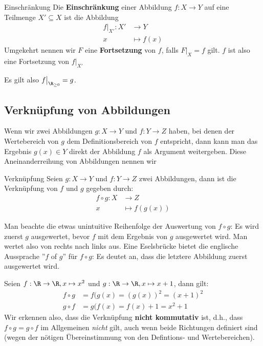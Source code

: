 \begin{definition}{Einschränkung}{}
Die \textbf{Einschränkung} einer Abbildung $f: X \to Y$ auf eine Teilmenge $X' \subseteq X$ ist die Abbildung
\begin{align*}
    f\big|_{X'}: X' &\to Y \\
    x & \mapsto f(x)
\end{align*}
Umgekehrt nennen wir $F$ eine \textbf{Fortsetzung} von $f$, falls $F\big|_X = f$ gilt. $f$ ist also eine Fortsetzung von $f\big|_{X'}$
\end{definition}
\begin{example} Es gilt also $f\big|_{\R_{\geq 0}} = g$.
\end{example}

\subsection{Verknüpfung von Abbildungen}
Wenn wir zwei Abbildungen $g: X \to Y$ und $f: Y \to Z$ haben, bei denen der Wertebereich von $g$ dem Definitionsbereich von $f$ entspricht, dann kann man das Ergebnis $g(x) \in Y$ direkt der Abbildung $f$ als Argument weitergeben. Diese Aneinanderreihung von Abbildungen nennen wir 

\begin{definition}{Verknüpfung}{}
Seien  $g: X \to Y$ und $f: Y \to Z$ zwei Abbildungen, dann ist die Verknüpfung von $f$ und $g$ gegeben durch:
\begin{align*}
    f \circ g: X &\to Z\\ x &\mapsto f(g(x))
\end{align*}
\end{definition}
\begin{remark}
Man beachte die etwas unintuitive Reihenfolge der Auswertung von $f \circ g$: Es wird zuerst $g$ ausgewertet, bevor $f$ mit dem Ergebnis von $g$ ausgewertet wird. Man wertet also von rechts nach links aus. Eine Eselsbrücke bietet die englische Aussprache ''$f$ of $g$'' für $f\circ g$: Es deutet an, dass die letztere Abbildung zuerst ausgewertet wird.
\end{remark}

\begin{example}[Funktionen in $\R$]
Seien $f: \R \to \R, x \mapsto x^2$ und $g: \R \to \R, x \mapsto x + 1$, dann gilt:
\begin{align*}
    f\circ g &= f(g(x) = (g(x))^2 = (x + 1)^2\\
    g\circ f &= g(f(x) = f(x) + 1 = x^2 + 1
\end{align*}
Wir erkennen also, dass die Verknüpfung \textbf{nicht kommutativ} ist, d.h., dass $f \circ g = g \circ f$ im Allgemeinen \textit{nicht} gilt, auch wenn beide Richtungen definiert sind (wegen der nötigen Übereinstimmung von den Defintions- und Wertebereichen).
\end{example}

